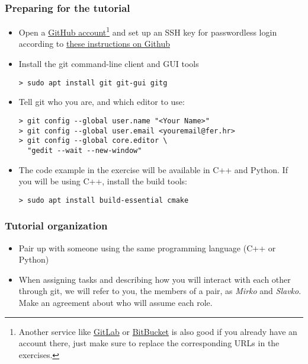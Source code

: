 \begin{frame}[fragile]

\frametitle{Preparing for the tutorial}
	
\begin{itemize}
	\item  Open a \href{https://github.com/join?source=header-home}{GitHub account}\footnote{Another service like \href{https://gitlab.com}{GitLab} or \href{https://bitbucket.org/}{BitBucket} is also good if you already have an account there, just make sure to replace the corresponding URLs in the exercises.} and set up an SSH key for passwordless login according to \href{https://help.github.com/articles/adding-a-new-ssh-key-to-your-github-account/}{these instructions on Github}
	\item Install the git command-line client and GUI tools
	\begin{verbatim}
> sudo apt install git git-gui gitg
	\end{verbatim}
	\item Tell git who you are, and which editor to use:
	\begin{verbatim}
> git config --global user.name "<Your Name>"
> git config --global user.email <youremail@fer.hr>
> git config --global core.editor \
  "gedit --wait --new-window"
	\end{verbatim}
	\item The code example in the exercise will be available in C++ and Python. If you will be using C++, install the build tools:
	\begin{verbatim}
> sudo apt install build-essential cmake
	\end{verbatim}
\end{itemize}

\end{frame}


\begin{frame}

\frametitle{Tutorial organization}
	
\begin{itemize}
	\item Pair up with someone using the same programming language (C++ or Python)
	\item When assigning tasks and describing how you will interact with each other through git, we will refer to you, the members of a pair, as \textit{Mirko} and \textit{Slavko}. Make an agreement about who will assume each role.
\end{itemize}
	
\end{frame}

